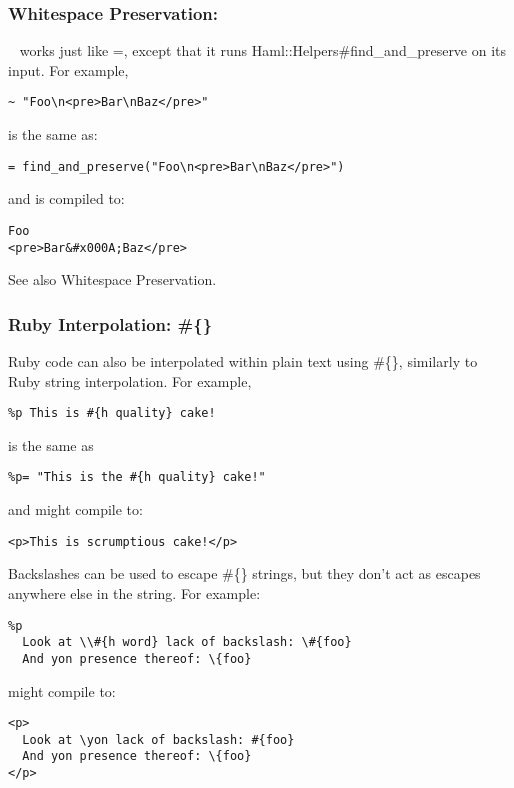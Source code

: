 \documentclass[10pt]{article}
\begin{document}
\subsubsection*{Whitespace Preservation: ~}


 ~ works just like =, except that it runs Haml::Helpers\#find\_and\_preserve on its input. For example,
\begin{verbatim}
~ "Foo\n<pre>Bar\nBaz</pre>"
\end{verbatim}


 is the same as:
\begin{verbatim}
= find_and_preserve("Foo\n<pre>Bar\nBaz</pre>")
\end{verbatim}


 and is compiled to:
\begin{verbatim}
Foo
<pre>Bar&#x000A;Baz</pre>
\end{verbatim}


 See also Whitespace Preservation.
\subsubsection*{Ruby Interpolation: \#\{\}}


 Ruby code can also be interpolated within plain text using \#\{\}, similarly to Ruby string interpolation. For example,
\begin{verbatim}
%p This is #{h quality} cake!
\end{verbatim}


 is the same as
\begin{verbatim}
%p= "This is the #{h quality} cake!"
\end{verbatim}


 and might compile to:
\begin{verbatim}
<p>This is scrumptious cake!</p>
\end{verbatim}


 Backslashes can be used to escape \#\{\} strings, but they don’t act as escapes anywhere else in the string. For example:
\begin{verbatim}
%p
  Look at \\#{h word} lack of backslash: \#{foo}
  And yon presence thereof: \{foo}
\end{verbatim}


 might compile to:
\begin{verbatim}
<p>
  Look at \yon lack of backslash: #{foo}
  And yon presence thereof: \{foo}
</p>
\end{verbatim}
\end{document}
